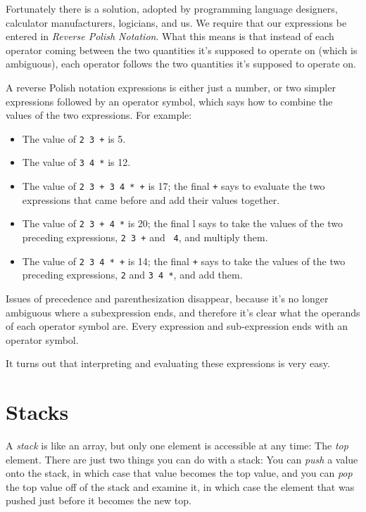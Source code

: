 Fortunately there is a solution, adopted by programming language
designers, calculator manufacturers, logicians, and us.  We require that
our expressions be entered in {\em Reverse Polish Notation}\/.  What
this means is that instead of each operator coming between the two
quantities it's supposed to operate on (which is ambiguous), each
operator follows the two quantities it's supposed to operate on.

A reverse Polish notation expressions is either just a number, or two
simpler expressions followed by an operator symbol, which says how to
combine the values of the two expressions. 
For example:  
\begin{itemize}
\item The value of {\tt 2 3 +}  is 5.
\item The value of {\tt 3 4 *}  is 12.
\item The value of {\tt 2 3 + 3 4 * +} is 17; the final {\tt +} says to
evaluate the two expressions that came before and add their values
together.
\item The value of {\tt 2 3 + 4 *} is 20; the final l{\tt *} says to
take the values of the two preceding expressions, {\tt 2 3 +} and {\tt
4}, and multiply them.
\item The value of {\tt 2 3 4 * +} is 14; the final {\tt +} says to take
the values of the two preceding expressions, {\tt 2} and {\tt 3 4 *},
and add them.
\end{itemize}

Issues of precedence and parenthesization disappear, because it's no
longer ambiguous where a subexpression ends, and therefore it's clear
what the operands of each operator symbol are.  Every expression and
sub-expression ends with an operator symbol.  

It turns out that interpreting and evaluating these expressions is very
easy.  

\section{Stacks}

A {\em stack}\/ is like an array, but only one element is accessible at
any time:  The {\em top}\/ element. There are just two things you can do
with a stack:  You can {\em push}\/ a value onto the stack, in which
case that value becomes the top value, and you can {\em pop}\/ the top
value off of the stack and examine it, in which case the element that
was pushed just before it becomes the new top.

